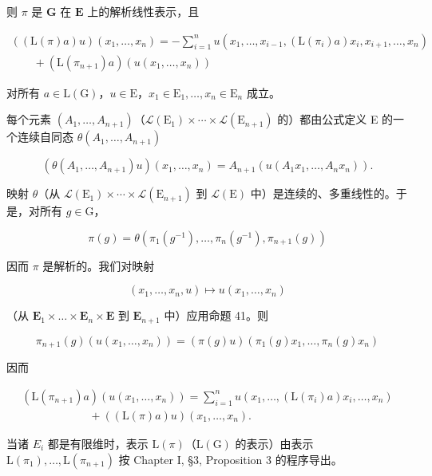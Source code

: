 则 \(\pi\) 是 \(\mathbf{G}\) 在 \(\mathbf{E}\) 上的解析线性表示，且

\[
\begin{array}{l} ((\mathrm{L} (\pi) a) u) (x _ {1}, \ldots , x _ {n}) = - \sum_ {i = 1} ^ {n} u (x _ {1}, \ldots , x _ {i - 1}, (\mathrm{L} (\pi_ {i}) a) x _ {i}, x _ {i + 1}, \ldots , x _ {n}) \\ \qquad + (\mathrm{L} (\pi_ {n + 1}) a) (u (x _ {1}, \ldots , x _ {n})) \end{array}
\]

对所有 \(a \in \mathrm{L}(\mathrm{G})\)，\(u \in \mathrm{E}\)，\(x_1 \in \mathrm{E}_1, \ldots, x_n \in \mathrm{E}_n\) 成立。

每个元素 \((A_{1},\ldots,A_{n+1})\)（\(\mathcal{L}(\mathrm{E}_{1})\times\cdots\times\mathcal{L}(\mathrm{E}_{n+1})\) 的）都由公式定义 E 的一个连续自同态 \(\theta(A_{1},\ldots,A_{n+1})\)

\[
(\theta (A _ {1}, \dots , A _ {n + 1}) u) (x _ {1}, \dots , x _ {n}) = A _ {n + 1} (u (A _ {1} x _ {1}, \dots , A _ {n} x _ {n})).
\]

映射 \(\theta\)（从 \(\mathcal{L}(\mathrm{E}_1) \times \cdots \times \mathcal{L}(\mathrm{E}_{n+1})\) 到 \(\mathcal{L}(\mathrm{E})\) 中）是连续的、多重线性的。于是，对所有 \(g \in \mathrm{G}\)，

\[
\pi (g) = \theta (\pi_ {1} (g ^ {- 1}), \dots , \pi_ {n} (g ^ {- 1}), \pi_ {n + 1} (g))
\]

因而 \(\pi\) 是解析的。我们对映射

\[
\left(x _ {1}, \dots , x _ {n}, u\right) \mapsto u \left(x _ {1}, \dots , x _ {n}\right)
\]

（从 \(\mathbf{E}_1\times \dots \times \mathbf{E}_n\times \mathbf{E}\) 到 \(\mathbf{E}_{n + 1}\) 中）应用命题 41。则

\[
\pi_ {n + 1} (g) \left(u \left(x _ {1}, \dots , x _ {n}\right)\right) = (\pi (g) u) \left(\pi_ {1} (g) x _ {1}, \dots , \pi_ {n} (g) x _ {n}\right)
\]

因而

\[
\begin{array}{l} (\mathrm{L} (\pi_ {n + 1}) a) (u (x _ {1}, \ldots , x _ {n})) = \sum_ {i = 1} ^ {n} u (x _ {1}, \ldots , (\mathrm{L} (\pi_ {i}) a) x _ {i}, \ldots , x _ {n}) \\ \qquad \qquad \qquad + ((\mathrm{L} (\pi) a) u) (x _ {1}, \ldots , x _ {n}). \end{array}
\]

当诸 \(E_{i}\) 都是有限维时，表示 \(\mathrm{L}(\pi)\)（\(\mathrm{L}(\mathrm{G})\) 的表示）由表示 \(\mathrm{L}(\pi_{1}),\ldots,\mathrm{L}(\pi_{n+1})\) 按 Chapter I, §3, Proposition 3 的程序导出。

